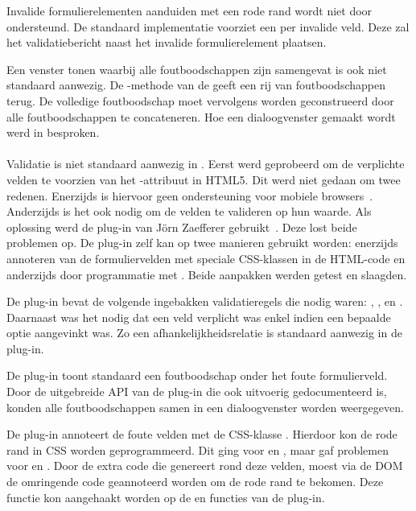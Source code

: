 Invalide formulierelementen aanduiden met een rode rand wordt niet door \kendo{} ondersteund.
De standaard implementatie voorziet een  per invalide veld.
Deze zal het validatiebericht naast het invalide formulierelement plaatsen. 

Een venster tonen waarbij alle foutboodschappen zijn samengevat is ook niet standaard aanwezig.
De -methode van de  geeft een rij van foutboodschappen terug.
De volledige foutboodschap moet vervolgens worden geconstrueerd door alle foutboodschappen te concateneren.
Hoe een dialoogvenster gemaakt wordt werd in  besproken.

\paragraph{\jqm}
Validatie is niet standaard aanwezig in \jqm. 
Eerst werd geprobeerd om de verplichte velden te voorzien van het -attribuut in HTML5. 
Dit werd niet gedaan om twee redenen.
Enerzijds is hiervoor geen ondersteuning voor mobiele browsers~\cite{Deveria2013c}. 
Anderzijds is het ook nodig om de velden te valideren op hun waarde.
Als oplossing werd de plug-in van Jörn Zaefferer gebruikt~\cite{Zaefferer2013}. 
Deze lost beide problemen op.
De plug-in zelf kan op twee manieren gebruikt worden: enerzijds annoteren van de formuliervelden met speciale CSS-klassen in de HTML-code en anderzijds door programmatie met \js{}. 
Beide aanpakken werden getest en slaagden. 

De plug-in bevat de volgende ingebakken validatieregels die nodig waren: , ,  en .
Daarnaast was het nodig dat een veld verplicht was enkel indien een bepaalde optie aangevinkt was.
Zo een afhankelijkheidsrelatie is standaard aanwezig in de plug-in.

De plug-in toont standaard een foutboodschap onder het foute formulierveld.
Door de uitgebreide API van de plug-in die ook uitvoerig gedocumenteerd is, konden alle foutboodschappen samen in een dialoogvenster worden weergegeven.

De plug-in annoteert de foute velden met de CSS-klasse .
Hierdoor kon de rode rand in CSS worden geprogrammeerd. 
Dit ging voor  en , maar gaf problemen voor  en .
Door de extra code die \jqm{} genereert rond deze velden, moest via de DOM de omringende code geannoteerd worden om de rode rand te bekomen. 
Deze functie kon aangehaakt worden op de  en  functies van de plug-in.


